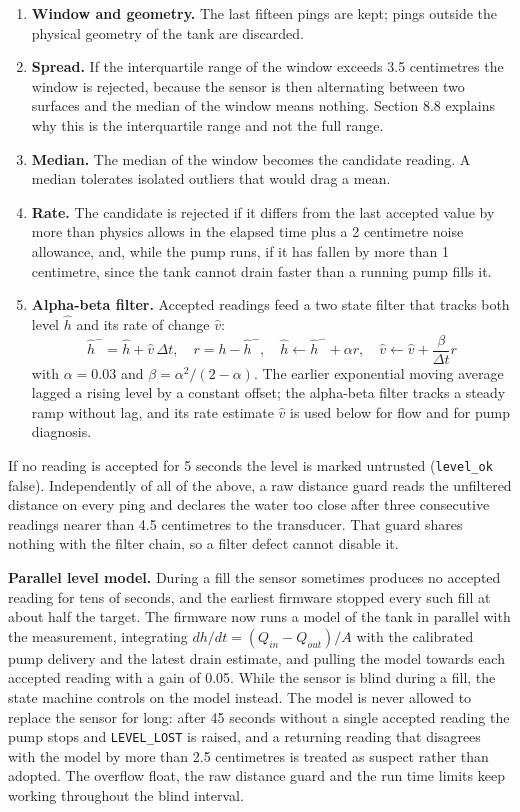\begin{enumerate}
\item \textbf{Window and geometry.} The last fifteen pings are kept; pings outside the physical geometry of the tank are discarded.
\item \textbf{Spread.} If the interquartile range of the window exceeds 3.5 centimetres the window is rejected, because the sensor is then alternating between two surfaces and the median of the window means nothing. Section 8.8 explains why this is the interquartile range and not the full range.
\item \textbf{Median.} The median of the window becomes the candidate reading. A median tolerates isolated outliers that would drag a mean.
\item \textbf{Rate.} The candidate is rejected if it differs from the last accepted value by more than physics allows in the elapsed time plus a 2 centimetre noise allowance, and, while the pump runs, if it has fallen by more than 1 centimetre, since the tank cannot drain faster than a running pump fills it.
\item \textbf{Alpha-beta filter.} Accepted readings feed a two state filter that tracks both level $\hat{h}$ and its rate of change $\hat{v}$:
\begin{equation}
\hat{h}^- = \hat{h} + \hat{v}\,\Delta t,\quad r = h - \hat{h}^-,\quad
\hat{h} \leftarrow \hat{h}^- + \alpha r,\quad \hat{v} \leftarrow \hat{v} + \frac{\beta}{\Delta t} r
\label{eq:alphabeta}
\end{equation}
with $\alpha = 0.03$ and $\beta = \alpha^2/(2-\alpha)$. The earlier exponential moving average lagged a rising level by a constant offset; the alpha-beta filter tracks a steady ramp without lag, and its rate estimate $\hat{v}$ is used below for flow and for pump diagnosis.
\end{enumerate}

If no reading is accepted for 5 seconds the level is marked untrusted (\texttt{level\_ok} false). Independently of all of the above, a raw distance guard reads the unfiltered distance on every ping and declares the water too close after three consecutive readings nearer than 4.5 centimetres to the transducer. That guard shares nothing with the filter chain, so a filter defect cannot disable it.

\textbf{Parallel level model.} During a fill the sensor sometimes produces no accepted reading for tens of seconds, and the earliest firmware stopped every such fill at about half the target. The firmware now runs a model of the tank in parallel with the measurement, integrating $dh/dt = (Q_{in} - Q_{out})/A$ with the calibrated pump delivery and the latest drain estimate, and pulling the model towards each accepted reading with a gain of 0.05. While the sensor is blind during a fill, the state machine controls on the model instead. The model is never allowed to replace the sensor for long: after 45 seconds without a single accepted reading the pump stops and \texttt{LEVEL\_LOST} is raised, and a returning reading that disagrees with the model by more than 2.5 centimetres is treated as suspect rather than adopted. The overflow float, the raw distance guard and the run time limits keep working throughout the blind interval.

